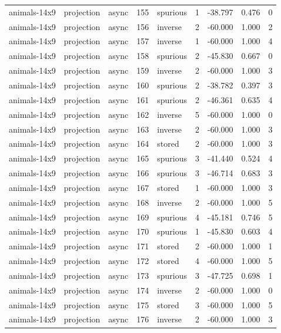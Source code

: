 \begin{tabular}{lllrlrrrr}
animals-14x9 & projection & async & 155 & spurious & 1 & -38.797 & 0.476 & 0 \\
animals-14x9 & projection & async & 156 & inverse & 2 & -60.000 & 1.000 & 2 \\
animals-14x9 & projection & async & 157 & inverse & 1 & -60.000 & 1.000 & 4 \\
animals-14x9 & projection & async & 158 & spurious & 2 & -45.830 & 0.667 & 0 \\
animals-14x9 & projection & async & 159 & inverse & 2 & -60.000 & 1.000 & 3 \\
animals-14x9 & projection & async & 160 & spurious & 2 & -38.782 & 0.397 & 3 \\
animals-14x9 & projection & async & 161 & spurious & 2 & -46.361 & 0.635 & 4 \\
animals-14x9 & projection & async & 162 & inverse & 5 & -60.000 & 1.000 & 0 \\
animals-14x9 & projection & async & 163 & inverse & 2 & -60.000 & 1.000 & 3 \\
animals-14x9 & projection & async & 164 & stored & 2 & -60.000 & 1.000 & 3 \\
animals-14x9 & projection & async & 165 & spurious & 3 & -41.440 & 0.524 & 4 \\
animals-14x9 & projection & async & 166 & spurious & 3 & -46.714 & 0.683 & 3 \\
animals-14x9 & projection & async & 167 & stored & 1 & -60.000 & 1.000 & 3 \\
animals-14x9 & projection & async & 168 & inverse & 2 & -60.000 & 1.000 & 5 \\
animals-14x9 & projection & async & 169 & spurious & 4 & -45.181 & 0.746 & 5 \\
animals-14x9 & projection & async & 170 & spurious & 1 & -45.830 & 0.603 & 4 \\
animals-14x9 & projection & async & 171 & stored & 2 & -60.000 & 1.000 & 1 \\
animals-14x9 & projection & async & 172 & stored & 4 & -60.000 & 1.000 & 5 \\
animals-14x9 & projection & async & 173 & spurious & 3 & -47.725 & 0.698 & 1 \\
animals-14x9 & projection & async & 174 & inverse & 2 & -60.000 & 1.000 & 0 \\
animals-14x9 & projection & async & 175 & stored & 3 & -60.000 & 1.000 & 5 \\
animals-14x9 & projection & async & 176 & inverse & 2 & -60.000 & 1.000 & 3 \\

\end{tabular}
